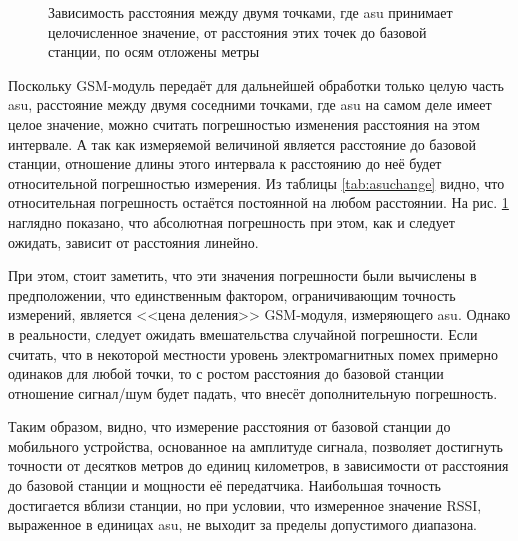 \begin{figure}[h]
	\caption{Зависимость расстояния между двумя точками, где asu принимает целочисленное значение, от расстояния этих точек до базовой станции, по осям отложены метры}
	\label{fig:dcelldasu}
\end{figure}

Поскольку GSM-модуль передаёт для дальнейшей обработки только целую часть asu, расстояние между двумя соседними точками, где asu на самом деле имеет целое значение, можно считать погрешностью изменения расстояния на этом интервале. А так как измеряемой величиной является расстояние до базовой станции, отношение длины этого интервала к расстоянию до неё будет относительной погрешностью измерения. Из таблицы \ref{tab:asuchange} видно, что относительная погрешность остаётся постоянной на любом расстоянии. На рис. \ref{fig:dcelldasu} наглядно показано, что абсолютная погрешность при этом, как и следует ожидать, зависит от расстояния линейно.

При этом, стоит заметить, что эти значения погрешности были вычислены в предположении, что единственным фактором, ограничивающим точность измерений, является <<цена деления>> GSM-модуля, измеряющего asu. Однако в реальности, следует ожидать вмешательства случайной погрешности. Если считать, что в некоторой местности уровень электромагнитных помех примерно одинаков для любой точки, то с ростом расстояния до базовой станции отношение сигнал/шум будет падать, что внесёт дополнительную погрешность.

Таким образом, видно, что измерение расстояния от базовой станции до мобильного устройства, основанное на амплитуде сигнала, позволяет достигнуть точности от десятков метров до единиц километров, в зависимости от расстояния до базовой станции и мощности её передатчика. Наибольшая точность достигается вблизи станции, но при условии, что измеренное значение RSSI, выраженное в единицах asu, не выходит за пределы допустимого диапазона.

